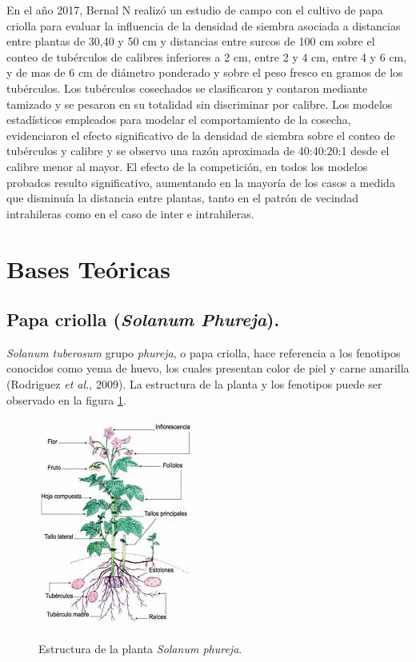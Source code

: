 En el año 2017, Bernal N realizó un estudio de campo con el cultivo de papa criolla para evaluar la influencia de la densidad de siembra asociada a distancias entre plantas de 30,40 y 50 cm y distancias entre surcos de 100 cm sobre el conteo de tubérculos de calibres inferiores a 2 cm, entre 2 y 4 cm, entre 4 y 6 cm, y de mas de 6 cm de diámetro ponderado y sobre el peso fresco en gramos de los tubérculos. Los tubérculos cosechados se clasificaron y contaron mediante tamizado y se pesaron en su totalidad sin discriminar por calibre. Los modelos estadísticos empleados para modelar el comportamiento de la cosecha, evidenciaron el efecto significativo de la densidad de siembra sobre el conteo de tubérculos y calibre y se observo una razón aproximada de 40:40:20:1 desde el calibre menor al mayor. El efecto de la competición, en todos los modelos probados resulto significativo, aumentando en la mayoría de los casos a medida que disminuía la distancia entre plantas, tanto en el patrón de vecindad intrahileras como en el caso de inter e intrahileras.

\section{Bases Te\'oricas}

\subsection{Papa criolla (\textit{Solanum Phureja}).}

\textit{Solanum tuberosum} grupo \textit{phureja}, o papa criolla, hace referencia a los fenotipos conocidos como yema de huevo, los cuales presentan color de piel y carne amarilla (Rodriguez \textit{et al.}, 2009). La estructura de la planta y los fenotipos puede ser observado en la figura \ref{fig:planta}.\\

\begin{figure}[h]
	\caption{Estructura de la planta \textit{Solanum phureja}.}
	\centering
	\includegraphics[scale=0.8]{planta.jpeg}
	\label{fig:planta}
\end{figure}

